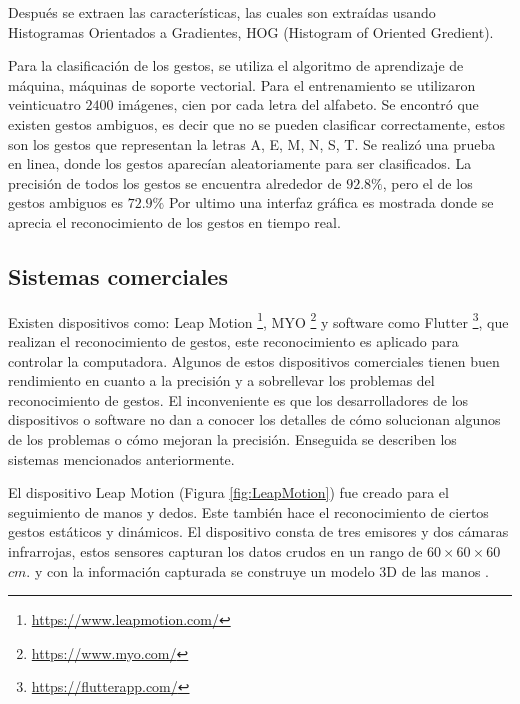 Después se extraen las características, las cuales son extraídas usando Histogramas Orientados a Gradientes, HOG (Histogram of Oriented Gredient).  

Para la clasificación de los gestos, se utiliza el algoritmo de aprendizaje de máquina, máquinas de soporte vectorial.
Para el entrenamiento se utilizaron veinticuatro $2400$ imágenes, cien por cada letra del alfabeto. Se encontró que existen gestos ambiguos, es decir que no se pueden clasificar correctamente, estos son los gestos que representan la letras A, E, M, N, S, T. 
Se realizó una prueba en linea, donde los gestos aparecían aleatoriamente para ser clasificados. La precisión de todos los gestos se encuentra alrededor de $92.8 \%$, pero el de los gestos ambiguos es $72.9 \%$
Por ultimo una interfaz gráfica es mostrada donde se aprecia el reconocimiento de los gestos en tiempo real.  


 
\subsection{Sistemas comerciales}

Existen dispositivos como: Leap Motion \footnote{\label{LeapMotionFN} \url{https://www.leapmotion.com/}}, MYO \footnote{\label{MyoFN}  \url{https://www.myo.com/}} y software como Flutter \footnote{\label{FlutterFN} \url{ https://flutterapp.com/}}, que realizan el reconocimiento de gestos, este reconocimiento es aplicado para controlar la computadora. Algunos de estos dispositivos comerciales tienen  buen rendimiento en cuanto a la precisión y a sobrellevar los problemas del reconocimiento de gestos. El inconveniente es que los desarrolladores de los dispositivos o software no dan a conocer los detalles de cómo solucionan algunos de los problemas o cómo mejoran la precisión. 
Enseguida se describen los sistemas mencionados anteriormente.
 
El dispositivo Leap Motion (Figura \ref{fig:LeapMotion}) fue creado para el seguimiento de manos y dedos. Este también hace el reconocimiento de ciertos gestos estáticos y dinámicos. El dispositivo consta de tres emisores y dos cámaras infrarrojas, estos sensores capturan los datos crudos en un rango de $60 \times 60 \times 60$ $cm.$ y con la información capturada se construye un modelo 3D de las manos \citep{Weichert2013}. 

